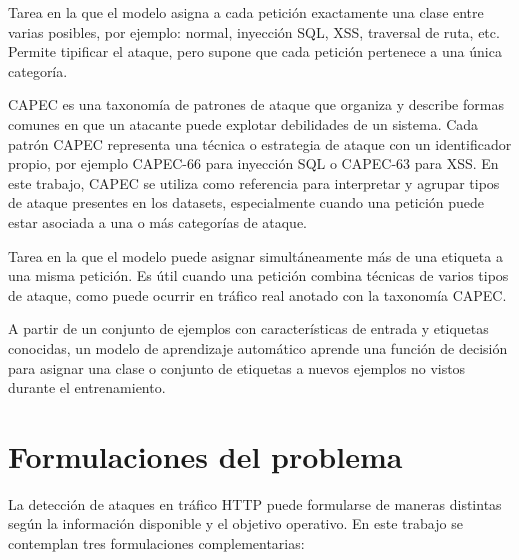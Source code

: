 \documentclass[12pt,oneside]{report}
\begin{document}
\begin{description}[leftmargin=0pt, labelindent=0pt]
  \item[\textbf{Clasificación multiclase.}]
  Tarea en la que el modelo asigna a cada petición exactamente una clase entre varias posibles, por ejemplo: normal, inyección SQL, XSS, traversal de ruta, etc. Permite tipificar el ataque, pero supone que cada petición pertenece a una única categoría.

  \item[\textbf{CAPEC (\textit{Common Attack Pattern Enumeration and Classification}).}]
  CAPEC es una taxonomía de patrones de ataque que organiza y describe formas comunes en que un atacante puede explotar debilidades de un sistema. Cada patrón CAPEC representa una técnica o estrategia de ataque con un identificador propio, por ejemplo CAPEC-66 para inyección SQL o CAPEC-63 para XSS. En este trabajo, CAPEC se utiliza como referencia para interpretar y agrupar tipos de ataque presentes en los datasets, especialmente cuando una petición puede estar asociada a una o más categorías de ataque.

  \item[\textbf{Clasificación multietiqueta.}]
  Tarea en la que el modelo puede asignar simultáneamente más de una etiqueta a una misma petición. Es útil cuando una petición combina técnicas de varios tipos de ataque, como puede ocurrir en tráfico real anotado con la taxonomía CAPEC.

  \item[\textbf{Modelo de \textit{Machine Learning} (aprendizaje automático).}]
  A partir de un conjunto de ejemplos con características de entrada y etiquetas conocidas, un modelo de aprendizaje automático aprende una función de decisión para asignar una clase o conjunto de etiquetas a nuevos ejemplos no vistos durante el entrenamiento.

\end{description}

\section{Formulaciones del problema}

La detección de ataques en tráfico HTTP puede formularse de maneras distintas según la información disponible y el objetivo operativo. En este trabajo se contemplan tres formulaciones complementarias:
\end{document}
